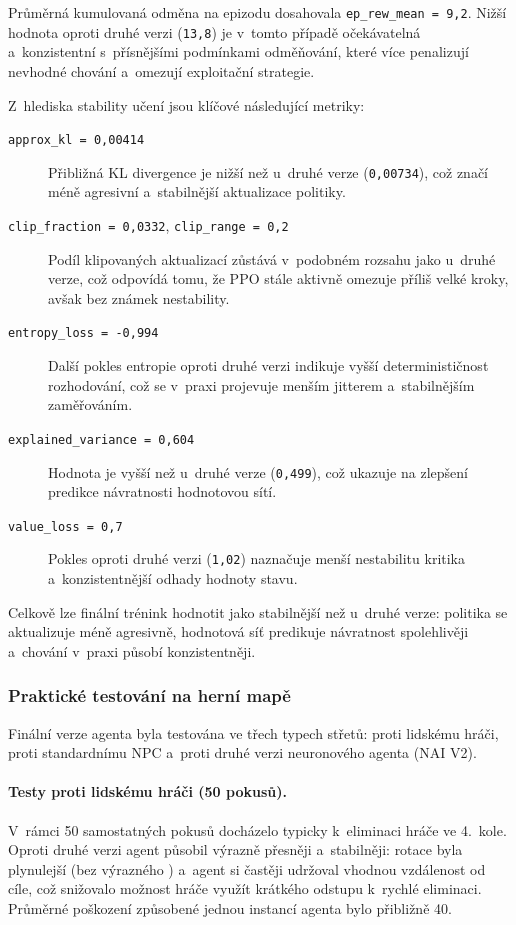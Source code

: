 Průměrná kumulovaná odměna na epizodu dosahovala \texttt{ep\_rew\_mean = 9{,}2}. Nižší hodnota oproti druhé verzi (\texttt{13{,}8}) je v~tomto případě očekávatelná a~konzistentní s~přísnějšími podmínkami odměňování, které více penalizují nevhodné chování a~omezují exploitační strategie.

Z~hlediska stability učení jsou klíčové následující metriky:

\begin{description}
    \item[\texttt{approx\_kl = 0{,}00414}] Přibližná KL divergence je nižší než u~druhé verze (\texttt{0{,}00734}), což značí méně agresivní a~stabilnější aktualizace politiky.
    \item[\texttt{clip\_fraction = 0{,}0332}, \texttt{clip\_range = 0{,}2}] Podíl klipovaných aktualizací zůstává v~podobném rozsahu jako u~druhé verze, což odpovídá tomu, že PPO stále aktivně omezuje příliš velké kroky, avšak bez známek nestability.
    \item[\texttt{entropy\_loss = -0{,}994}] Další pokles entropie oproti druhé verzi indikuje vyšší determinističnost rozhodování, což se v~praxi projevuje menším jitterem a~stabilnějším zaměřováním.
    \item[\texttt{explained\_variance = 0{,}604}] Hodnota je vyšší než u~druhé verze (\texttt{0{,}499}), což ukazuje na zlepšení predikce návratnosti hodnotovou sítí.
    \item[\texttt{value\_loss = 0{,}7}] Pokles oproti druhé verzi (\texttt{1{,}02}) naznačuje menší nestabilitu kritika a~konzistentnější odhady hodnoty stavu.
\end{description}

Celkově lze finální trénink hodnotit jako stabilnější než u~druhé verze: politika se aktualizuje méně agresivně, hodnotová síť predikuje návratnost spolehlivěji a~chování v~praxi působí konzistentněji.

\subsubsection{Praktické testování na herní mapě}

Finální verze agenta byla testována ve třech typech střetů: proti lidskému hráči, proti standardnímu NPC a~proti druhé verzi neuronového agenta (NAI V2).

\paragraph{Testy proti lidskému hráči (50 pokusů).}
V~rámci 50 samostatných pokusů docházelo typicky k~eliminaci hráče ve 4.~kole. Oproti druhé verzi agent působil výrazně přesněji a~stabilněji: rotace byla plynulejší (bez výrazného ) a~agent si častěji udržoval vhodnou vzdálenost od cíle, což snižovalo možnost hráče využít krátkého odstupu k~rychlé eliminaci. Průměrné poškození způsobené jednou instancí agenta bylo přibližně 40.


